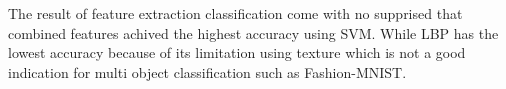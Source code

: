 \documentclass[a4paper,10pt]{article}
\begin{document}
The result of feature extraction classification come with no supprised that combined features achived the highest accuracy using SVM\@.
While LBP has the lowest accuracy because of its limitation using texture which is not a good indication for multi object classification such as Fashion-MNIST.

\printbibliography{}
\end{document}
